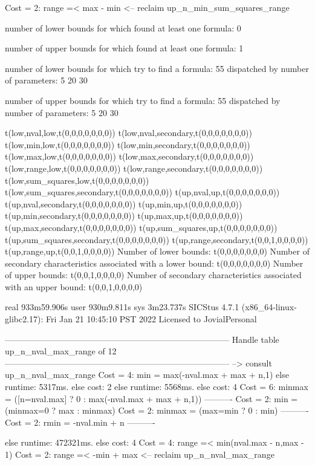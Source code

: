 Cost =  2:  range =< max - min
<-- reclaim up_n_min_sum_squares_range

number of lower bounds for which found at least one formula: 0

number of upper bounds for which found at least one formula: 1

number of lower bounds for which try to find a formula: 55
dispatched by number of parameters: 5  20  30

number of upper bounds for which try to find a formula: 55
dispatched by number of parameters: 5  20  30

t(low,nval,low,t(0,0,0,0,0,0,0))
t(low,nval,secondary,t(0,0,0,0,0,0,0))
t(low,min,low,t(0,0,0,0,0,0,0))
t(low,min,secondary,t(0,0,0,0,0,0,0))
t(low,max,low,t(0,0,0,0,0,0,0))
t(low,max,secondary,t(0,0,0,0,0,0,0))
t(low,range,low,t(0,0,0,0,0,0,0))
t(low,range,secondary,t(0,0,0,0,0,0,0))
t(low,sum_squares,low,t(0,0,0,0,0,0,0))
t(low,sum_squares,secondary,t(0,0,0,0,0,0,0))
t(up,nval,up,t(0,0,0,0,0,0,0))
t(up,nval,secondary,t(0,0,0,0,0,0,0))
t(up,min,up,t(0,0,0,0,0,0,0))
t(up,min,secondary,t(0,0,0,0,0,0,0))
t(up,max,up,t(0,0,0,0,0,0,0))
t(up,max,secondary,t(0,0,0,0,0,0,0))
t(up,sum_squares,up,t(0,0,0,0,0,0,0))
t(up,sum_squares,secondary,t(0,0,0,0,0,0,0))
t(up,range,secondary,t(0,0,1,0,0,0,0))
t(up,range,up,t(0,0,1,0,0,0,0))
Number of lower bounds:                                             t(0,0,0,0,0,0,0)
Number of secondary characteristics associated with a lower bound:  t(0,0,0,0,0,0,0)
Number of upper bounds:                                             t(0,0,1,0,0,0,0)
Number of secondary characteristics associated with an upper bound: t(0,0,1,0,0,0,0)

real	933m59.906s
user	930m9.811s
sys	3m23.737s
SICStus 4.7.1 (x86_64-linux-glibc2.17): Fri Jan 21 10:45:10 PST 2022
Licensed to JovialPersonal


--------------------------------------------------------------------------------
Handle table up_n_nval_max_range of 12
--------------------------------------------------------------------------------
--> consult up_n_nval_max_range
Cost =  4:  min    = max(-nval.max + max + n,1)
else runtime: 5317ms. else cost: 2
else runtime: 5568ms. else cost: 4
Cost =  6:  minmax = ([n=nval.max] ? 0 : max(-nval.max + max + n,1)) %
----------
Cost =  2:  min    = (minmax=0 ? max : minmax)
Cost =  2:  minmax = (max=min ? 0 : min)
----------
Cost =  2:  rmin   = -nval.min + n
----------

else runtime: 472321ms. else cost: 4
Cost =  4:  range =< min(nval.max - n,max - 1) %
Cost =  2:  range =< -min + max
<-- reclaim up_n_nval_max_range

